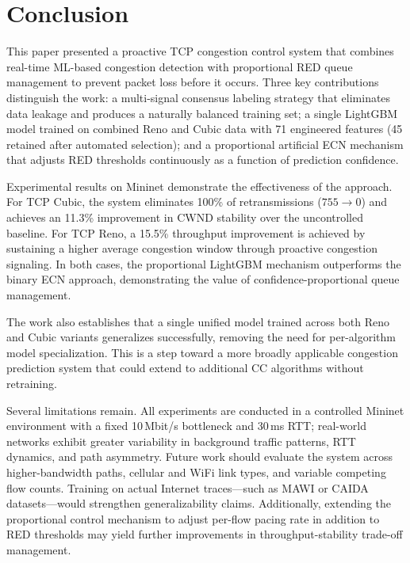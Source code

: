 \section{Conclusion}
\label{sec:conclusion}

This paper presented a proactive TCP congestion control system that combines real-time ML-based congestion detection with proportional RED queue management to prevent packet loss before it occurs. Three key contributions distinguish the work: a multi-signal consensus labeling strategy that eliminates data leakage and produces a naturally balanced training set; a single LightGBM model trained on combined Reno and Cubic data with 71 engineered features (45 retained after automated selection); and a proportional artificial ECN mechanism that adjusts RED thresholds continuously as a function of prediction confidence.

Experimental results on Mininet demonstrate the effectiveness of the approach. For TCP Cubic, the system eliminates 100\% of retransmissions ($755 \rightarrow 0$) and achieves an 11.3\% improvement in CWND stability over the uncontrolled baseline. For TCP Reno, a 15.5\% throughput improvement is achieved by sustaining a higher average congestion window through proactive congestion signaling. In both cases, the proportional LightGBM mechanism outperforms the binary ECN approach, demonstrating the value of confidence-proportional queue management.

The work also establishes that a single unified model trained across both Reno and Cubic variants generalizes successfully, removing the need for per-algorithm model specialization. This is a step toward a more broadly applicable congestion prediction system that could extend to additional CC algorithms without retraining.

Several limitations remain. All experiments are conducted in a controlled Mininet environment with a fixed 10\,Mbit/s bottleneck and 30\,ms RTT; real-world networks exhibit greater variability in background traffic patterns, RTT dynamics, and path asymmetry. Future work should evaluate the system across higher-bandwidth paths, cellular and WiFi link types, and variable competing flow counts. Training on actual Internet traces---such as MAWI or CAIDA datasets---would strengthen generalizability claims. Additionally, extending the proportional control mechanism to adjust per-flow pacing rate in addition to RED thresholds may yield further improvements in throughput-stability trade-off management.

